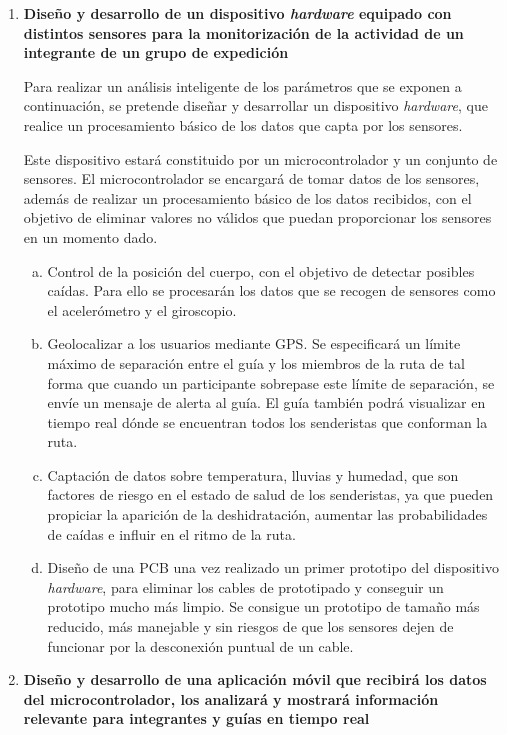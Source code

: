 \begin{enumerate}[1)]
\item \textbf{Diseño y desarrollo de un dispositivo \textit{hardware} equipado con distintos sensores para la monitorización de la actividad de un integrante de un grupo de expedición}

Para realizar un análisis inteligente de los parámetros que se exponen a continuación, se pretende diseñar y desarrollar un dispositivo \textit{hardware}, que realice un procesamiento básico de los datos que capta por los sensores.

Este dispositivo estará constituido por un microcontrolador y un conjunto de sensores. El microcontrolador se encargará de tomar datos de los sensores, además de realizar un procesamiento básico de los datos recibidos, con el objetivo de eliminar valores no válidos que puedan proporcionar los sensores en un momento dado.

\begin{enumerate}[a)]
\item Control de la posición del cuerpo, con el objetivo de detectar posibles caídas. Para ello se procesarán los datos que se recogen de sensores como el acelerómetro y el giroscopio.
\item Geolocalizar a los usuarios mediante \acs{GPS}. Se especificará un límite máximo de separación entre el guía y los miembros de la ruta de tal forma que cuando un participante sobrepase este límite de separación, se envíe un mensaje de alerta al guía. El guía también podrá visualizar en tiempo real dónde se encuentran todos los senderistas que conforman la ruta.
\item Captación de datos sobre temperatura, lluvias y humedad, que son factores de riesgo en el estado de salud de los senderistas, ya que pueden propiciar la aparición de la deshidratación, aumentar las probabilidades de caídas e influir en el ritmo de la ruta.
\item Diseño de una \ac{PCB} una vez realizado un primer prototipo del dispositivo \textit{hardware}, para eliminar los cables de prototipado y conseguir un prototipo mucho más limpio. Se consigue un prototipo de tamaño más reducido, más manejable y sin riesgos de que los sensores dejen de funcionar por la desconexión puntual de un cable. 
\end{enumerate}

\item \textbf{Diseño y desarrollo de una aplicación móvil que recibirá los datos del microcontrolador, los analizará y mostrará información relevante para integrantes y guías en tiempo real}


\end{enumerate}
